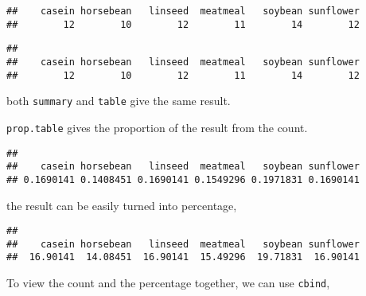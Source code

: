 \documentclass[]{book}
\newenvironment{Shaded}{\begin{snugshade}}{\end{snugshade}}
\newcommand{\KeywordTok}[1]{\textcolor[rgb]{0.13,0.29,0.53}{\textbf{#1}}}
\newcommand{\DecValTok}[1]{\textcolor[rgb]{0.00,0.00,0.81}{#1}}
\newcommand{\OperatorTok}[1]{\textcolor[rgb]{0.81,0.36,0.00}{\textbf{#1}}}
\newcommand{\NormalTok}[1]{#1}
\theoremstyle{definition}
\theoremstyle{definition}
\theoremstyle{remark}
\begin{document}
\begin{verbatim}
##    casein horsebean   linseed  meatmeal   soybean sunflower 
##        12        10        12        11        14        12
\end{verbatim}

\begin{Shaded}
\end{Shaded}

\begin{verbatim}
## 
##    casein horsebean   linseed  meatmeal   soybean sunflower 
##        12        10        12        11        14        12
\end{verbatim}

both \texttt{summary} and \texttt{table} give the same result.

\texttt{prop.table} gives the proportion of the result from the count.

\begin{Shaded}
\end{Shaded}

\begin{verbatim}
## 
##    casein horsebean   linseed  meatmeal   soybean sunflower 
## 0.1690141 0.1408451 0.1690141 0.1549296 0.1971831 0.1690141
\end{verbatim}

the result can be easily turned into percentage,

\begin{Shaded}
\end{Shaded}

\begin{verbatim}
## 
##    casein horsebean   linseed  meatmeal   soybean sunflower 
##  16.90141  14.08451  16.90141  15.49296  19.71831  16.90141
\end{verbatim}

To view the count and the percentage together, we can use
\texttt{cbind},
\end{document}
